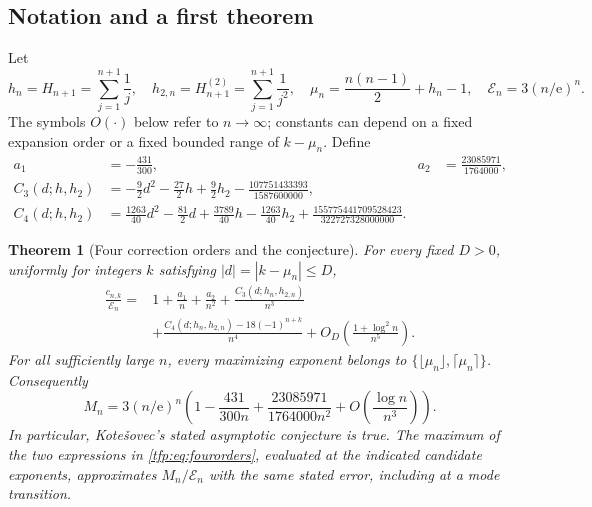 \documentclass[11pt,a4paper]{article}
\numberwithin{equation}{section}
\newtheorem{theorem}{Theorem}[section]
\theoremstyle{definition}\newtheorem{definition}[theorem]{Definition}
\theoremstyle{remark}\newtheorem{remark}[theorem]{Remark}
\newcommand{\ee}{\mathrm e}
\newcommand{\calE}{\mathcal E}
\newcommand{\HH}[2]{H_{#1}^{(#2)}}
\begin{document}
\subsection{Notation and a first theorem}
Let
\begin{equation}\label{tfp:eq:notation}
 h_n=H_{n+1}=\sum_{j=1}^{n+1}\frac1j,
 \quad h_{2,n}=\HH{n+1}{2}=\sum_{j=1}^{n+1}\frac1{j^2},
 \quad \mu_n=\frac{n(n-1)}2+h_n-1,
 \quad \calE_n=3(n/\ee)^n.
\end{equation}
The symbols $O(\cdot)$ below refer to $n\to\infty$; constants can depend
on a fixed expansion order or a fixed bounded range of $k-\mu_n$.
Define
\begin{align}
 a_1&=-\frac{431}{300}, &
 a_2&=\frac{23085971}{1764000},\label{tfp:eq:a12}\\
 C_3(d;h,h_2)&=-\frac92d^2-\frac{27}2h+\frac92h_2
                  -\frac{107751433393}{1587600000},\label{tfp:eq:C3}\\
 C_4(d;h,h_2)&=\frac{1263}{40}d^2-\frac{81}2d
       +\frac{3789}{40}h-\frac{1263}{40}h_2
       +\frac{155775441709528423}{322727328000000}.
       \label{tfp:eq:C4}
\end{align}

\begin{theorem}[Four correction orders and the conjecture]\label{tfp:thm:main}
For every fixed $D>0$, uniformly for integers $k$ satisfying
$|d|=|k-\mu_n|\le D$,
\begin{equation}\label{tfp:eq:fourorders}
\begin{split}
 \frac{c_{n,k}}{\calE_n}
  ={}&1+\frac{a_1}{n}+\frac{a_2}{n^2}
     +\frac{C_3(d;h_n,h_{2,n})}{n^3}\\
    &+\frac{C_4(d;h_n,h_{2,n})-18(-1)^{n+k}}{n^4}
     +O_D\!\left(\frac{1+\log^2 n}{n^5}\right).
\end{split}
\end{equation}
For all sufficiently large $n$, every maximizing exponent belongs to
$\{\lfloor\mu_n\rfloor,\lceil\mu_n\rceil\}$. Consequently
\begin{equation}\label{tfp:eq:leading}
 M_n=3(n/\ee)^n\left(1-\frac{431}{300n}
            +\frac{23085971}{1764000n^2}
            +O\!\left(\frac{\log n}{n^3}\right)\right).
\end{equation}
In particular, Kote\v{s}ovec's stated asymptotic conjecture is true.
The maximum of the two expressions in \eqref{tfp:eq:fourorders}, evaluated at
the indicated candidate exponents, approximates $M_n/\calE_n$ with the
same stated error, including at a mode transition.
\end{theorem}
\end{document}
